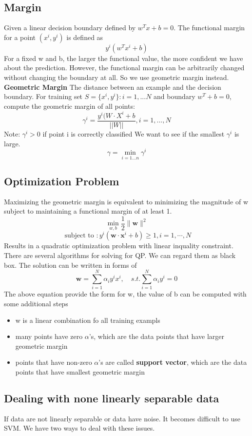 \documentclass[11pt]{article}
\begin{document}
\subsection{Margin}
\label{sec:org107c700}
Given a linear decision boundary defined by \(w^Tx+b=0\). The functional margin for a point \((x^i, y^i)\) is defined as
$$
y^i(w^Tx^i + b)
$$
For a fixed w and b, the larger the functional value, the more confident we have about the prediction. However, the functional margin can be arbitrarily changed without changing the boundary at all. So we use geometric margin instead.
\textbf{\textbf{Geometric Margin}}
The distance between an example and the decision boundary.
For training set \(S=\{x^i, y^i\}: i = 1, ... N\) and boundary \(w^T+ b = 0\), compute the geometric margin of all points: 
$$\gamma^i = \frac{y^i(W \cdot X^i + b}{||W||}, i = 1, ..., N$$
Note: \(\gamma^i > 0\) if point i is correctly classified
We want to see if the smallest \(\gamma^i\) is large. 
$$\gamma =\min_{i=1...n} \gamma^i$$
\subsection{Optimization Problem}
\label{sec:orgfc8b16b}
Maximizing the geometric margin is equivalent to minimizing the magnitude of w subject to maintaining a functional margin of at least 1. 
$$ \min _ { w ,b } \frac { 1} { 2} \| \mathbf { w } \| ^ { 2} $$
$$ \text{ subject to } : y ^ { i } \left( \mathbf { w } \cdot \mathbf { x } ^ { i } + b \right) \geq 1,i = 1,\cdots ,N $$
Results in a quadratic optimization problem with linear inquality constraint. There are several algorithms for solving for QP. We can regard them as black box. The solution can be written in forms of 
$$ \mathbf { w } = \sum _ { i = 1} ^ { N } \alpha _ { i } y ^ { i } x ^ { i } ,\quad s .t .\sum _ { i = 1} ^ { N } \alpha _ { i } y ^ { i } = 0 $$  
The above equation provide the form for w, the value of b can be computed with some additional steps
\begin{itemize}
\item w is a linear combination fo all training exampls
\item many points have zero \(\alpha\)'s, which are the data points that have larger geometric margin
\item points that have non-zero \(\alpha\)'s are called \textbf{\textbf{support vector}}, which are the data points that have smallest geometric margin
\end{itemize}

\subsection{Dealing with none linearly separable data}
\label{sec:orgd9a5284}
If data are not linearly separable or data have noise. It becomes difficult to use SVM. We have two ways to deal with these issues. 
\end{document}
